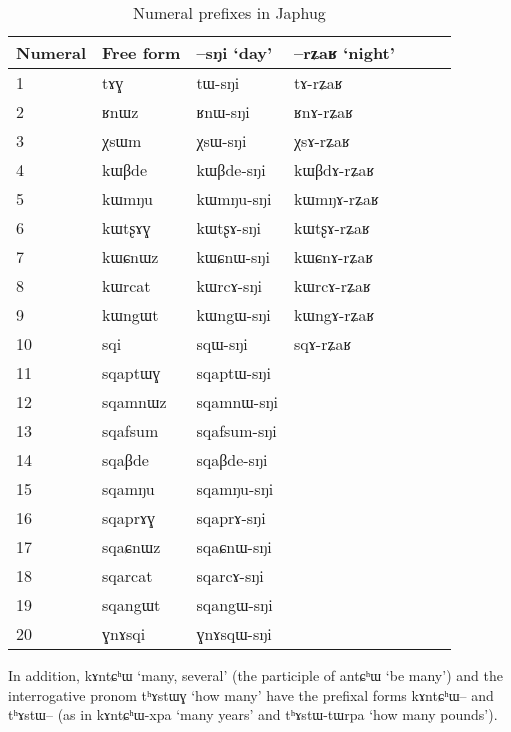 \documentclass[oldfontcommands,oneside,a4paper,12pt]{article}
\newcommand{\ipa}[1]{{\phon#1}}
\begin{document}
 \begin{table}[H]
\caption{Numeral prefixes in Japhug}  \label{tab:num.prefix} \centering
\begin{tabular}{lllllll}
\toprule
Numeral & Free form &  \ipa{--sŋi} `day' &  \ipa{--rʑaʁ} `night' \\
\midrule
 1	&	\ipa{tɤɣ}  &	\ipa{tɯ-sŋi}  &	\ipa{tɤ-rʑaʁ}  &	\\
2	&	\ipa{ʁnɯz}  &	\ipa{ʁnɯ-sŋi}  &	\ipa{ʁnɤ-rʑaʁ}  &	\\
3	&	\ipa{χsɯm}  &	\ipa{χsɯ-sŋi}  &	\ipa{χsɤ-rʑaʁ}  &	\\
4	&	\ipa{kɯβde}  &	\ipa{kɯβde-sŋi}  &	\ipa{kɯβdɤ-rʑaʁ}  &	\\
5	&	\ipa{kɯmŋu}  &	\ipa{kɯmŋu-sŋi}  &	\ipa{kɯmŋɤ-rʑaʁ}  &	\\
6	&	\ipa{kɯtʂɤɣ}  &	\ipa{kɯtʂɤ-sŋi}  &	\ipa{kɯtʂɤ-rʑaʁ}  &	\\
7	&	\ipa{kɯɕnɯz}  &	\ipa{kɯɕnɯ-sŋi}  &	\ipa{kɯɕnɤ-rʑaʁ}  &	\\
8	&	\ipa{kɯrcat}  &	\ipa{kɯrcɤ-sŋi}  &	\ipa{kɯrcɤ-rʑaʁ}  &	\\
9	&	\ipa{kɯngɯt}  &	\ipa{kɯngɯ-sŋi}  &	\ipa{kɯngɤ-rʑaʁ}  &	\\
10	&	\ipa{sqi}  &	\ipa{sqɯ-sŋi}  &\ipa{sqɤ-rʑaʁ}  &	\\
\midrule
11	&	\ipa{sqaptɯɣ}  &	\ipa{sqaptɯ-sŋi}  &	\\
12	&	\ipa{sqamnɯz}  &	\ipa{sqamnɯ-sŋi}  &	\\
13	&	\ipa{sqafsum}  &	\ipa{sqafsum-sŋi}  &	\\
14	&	\ipa{sqaβde}  &	\ipa{sqaβde-sŋi}  &	\\
15	&	\ipa{sqamŋu}  &	\ipa{sqamŋu-sŋi}  &	\\
16	&	\ipa{sqaprɤɣ}  &	\ipa{sqaprɤ-sŋi}  &	\\
17	&	\ipa{sqaɕnɯz}  &	\ipa{sqaɕnɯ-sŋi}  &	\\
18	&	\ipa{sqarcat}  &	\ipa{sqarcɤ-sŋi}  &	\\
19	&	\ipa{sqangɯt}  &	\ipa{sqangɯ-sŋi}  &	\\
20	&	\ipa{ɣnɤsqi}  &	\ipa{ɣnɤsqɯ-sŋi}  &	\\
\bottomrule
\end{tabular}
\end{table}
In addition,  \ipa{kɤntɕʰɯ} `many, several' (the participle of \ipa{antɕʰɯ} `be many') and the interrogative pronom \ipa{tʰɤstɯɣ} `how many' have the prefixal forms \ipa{kɤntɕʰɯ--} and \ipa{tʰɤstɯ--} (as in \ipa{kɤntɕʰɯ-xpa} `many years' and \ipa{tʰɤstɯ-tɯrpa} `how many pounds').
\end{document}
